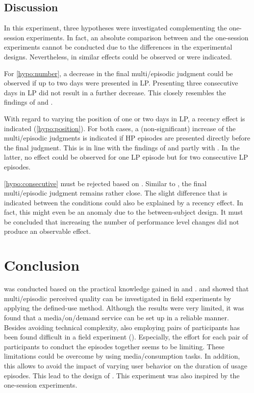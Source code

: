 \subsection{Discussion}
In this experiment, three hypotheses were investigated complementing the one-session experiments.
In fact, an absolute comparison between  and the one-session experiments cannot be conducted due to the differences in the experimental designs.
Nevertheless, in  similar effects could be observed or were indicated.

For \autoref{hypo:number}, a decrease in the final multi\-/episodic judgment could be observed if up to two days were presented in \ac{LP}.
Presenting three consecutive days in \ac{LP} did not result in a further decrease.
This closely resembles the findings of  and \EIIa{}.

With regard to varying the position of one or two days in \ac{LP}, a recency effect is indicated (\autoref{hypo:position}).
For both cases, a (non-significant) increase of the multi\-/episodic judgments is indicated if \ac{HP} episodes are presented directly before the final judgment.
This is in line with the findings of  and partly with \EIIa{}.
In the latter, no effect could be observed for one \ac{LP} episode but for two consecutive \ac{LP} episodes.

\autoref{hypo:consecutive} must be rejected based on .
Similar to \EIIa{}, the final multi\-/episodic judgment remains rather close.
The slight difference that is indicated between the conditions could also be explained by a recency effect.
In fact, this might even be an anomaly due to the between-subject design.
It must be concluded that increasing the number of performance level changes did not produce an observable effect.

\section{Conclusion}
 was conducted based on the practical knowledge gained in  and .
 and  showed that multi\-/episodic perceived quality can be investigated in field experiments by applying the defined-use method.
Although the results were very limited, it was found that a media\-/on\-/demand service can be set up in a reliable manner.
Besides avoiding technical complexity, also employing pairs of participants has been found difficult in a field experiment ().
Especially, the effort for each pair of participants to conduct the episodes together seems to be limiting.
These limitations could be overcome by using media\-/consumption tasks.
In addition, this allows to avoid the impact of varying user behavior on the duration of usage episodes.
This lead to the design of .
This experiment was also inspired by the one-session experiments.

